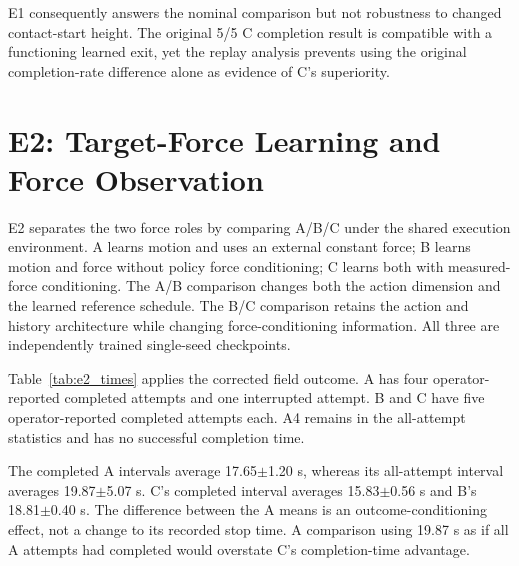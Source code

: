 E1 consequently answers the nominal comparison but not robustness to changed contact-start height. The original 5/5 C completion result is compatible with a functioning learned exit, yet the replay analysis prevents using the original completion-rate difference alone as evidence of C's superiority.

\section{E2: Target-Force Learning and Force Observation}
E2 separates the two force roles by comparing A/B/C under the shared execution environment. A learns motion and uses an external constant force; B learns motion and force without policy force conditioning; C learns both with measured-force conditioning. The A/B comparison changes both the action dimension and the learned reference schedule. The B/C comparison retains the action and history architecture while changing force-conditioning information. All three are independently trained single-seed checkpoints.

Table~\ref{tab:e2_times} applies the corrected field outcome. A has four operator-reported completed attempts and one interrupted attempt. B and C have five operator-reported completed attempts each. A4 remains in the all-attempt statistics and has no successful completion time.

\begin{table}[tbp]\centering\footnotesize
\caption[E2 corrected completion and interruption timing]{E2 timing with A4 corrected to interrupted. Completed-time statistics use A \(n=4\), B/C \(n=5\); all-attempt intervals use \(n=5\) in every condition. Values are mean \(\pm\) sample SD.}
\label{tab:e2_times}

\end{table}

The completed A intervals average 17.65\(\pm\)1.20 s, whereas its all-attempt interval averages 19.87\(\pm\)5.07 s. C's completed interval averages 15.83\(\pm\)0.56 s and B's 18.81\(\pm\)0.40 s. The difference between the A means is an outcome-conditioning effect, not a change to its recorded stop time. A comparison using 19.87 s as if all A attempts had completed would overstate C's completion-time advantage.


